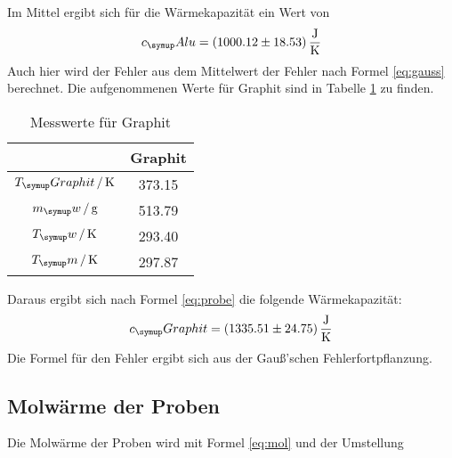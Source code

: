 Im Mittel ergibt sich für die Wärmekapazität ein Wert von
\begin{equation*}
  c_\su{Alu}=(1000.12\pm18.53)\,\si{\joule\per\kelvin}
\end{equation*}
Auch hier wird der Fehler aus dem Mittelwert der Fehler nach Formel \eqref{eq:gauss}
berechnet.
Die aufgenommenen Werte für Graphit sind in Tabelle \ref{tab:alug}
zu finden.
\begin{table}
  \centering
  \begin{tabular}{c c}
    \toprule
    \hrulefill & Graphit \\
    \midrule
    $T_\su{Graphit}\,/\Kel$& 373.15 \\
    $m_\su{w}\,/\gr$  & 513.79 \\
    $T_\su{w}\,/\Kel$ & 293.40 \\
    $T_\su{m}\,/\Kel$    & 297.87 \\
    \bottomrule
  \end{tabular}
  \caption{Messwerte für Graphit}
  \label{tab:alug}
\end{table}
Daraus ergibt sich nach Formel \eqref{eq:probe} die folgende Wärmekapazität:
\begin{equation}
  c_\su{Graphit}= (1335.51\pm24.75)\,\si{\joule\per\kelvin}
\end{equation}
Die Formel für den Fehler ergibt sich
aus der Gauß'schen Fehlerfortpflanzung.
\subsection{Molwärme der Proben}
Die Molwärme der Proben wird mit Formel \eqref{eq:mol} und der Umstellung

